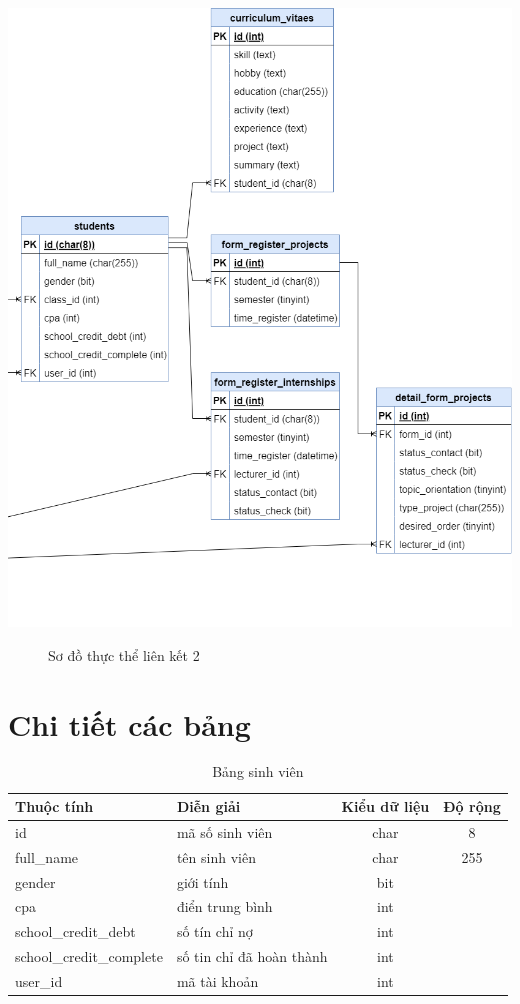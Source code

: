     \begin{center}
      \includegraphics[width=1.1\textwidth]{../drawio/db_sv33.png}
      \begin{figure}[h]
        \centering
        \caption{Sơ đồ thực thể liên kết 2}
      \end{figure}
    \end{center}

\section{Chi tiết các bảng}
    \begin{table}[h!]
      \centering
      \begin{tabular}{|l|p{}|c|c|}
        \hline
        \textbf{Thuộc tính} & \textbf{Diễn giải} & \textbf{Kiểu dữ liệu} & \textbf{Độ rộng} \\
        \hline
        id & mã số sinh viên & char & 8 \\
        \hline
        full\_name & tên sinh viên & char & 255 \\
        \hline
        gender & giới tính & bit & \\
        \hline
        cpa & điển trung bình & int & \\
        \hline
        school\_credit\_debt & số tín chỉ nợ & int & \\
        \hline
        school\_credit\_complete & số tin chỉ đã hoàn thành & int & \\
        \hline
        user\_id & mã tài khoản & int & \\
        \hline
      \end{tabular}
      \caption{Bảng sinh viên}
    \end{table}

